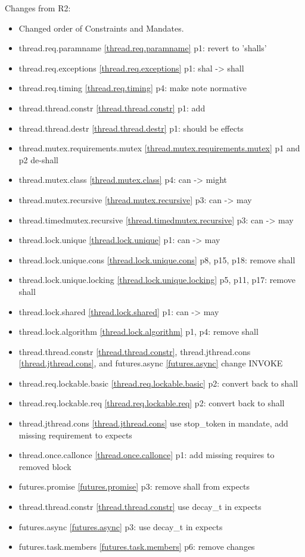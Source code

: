 Changes from R2:
\begin{itemize}
\item{Changed order of Constraints and Mandates.}
\item{ thread.req.paramname \ref{thread.req.paramname} p1: revert to 'shalls'}
\item{ thread.req.exceptions \ref{thread.req.exceptions} p1:  shal -> shall}
\item{ thread.req.timing \ref{thread.req.timing} p4: make note normative}
\item{ thread.thread.constr \ref{thread.thread.constr} p1: add }
\item{ thread.thread.destr \ref{thread.thread.destr}  p1: should be effects}
\item{ thread.mutex.requirements.mutex \ref{thread.mutex.requirements.mutex} p1 and p2 de-shall}
\item{ thread.mutex.class \ref{thread.mutex.class} p4: can -> might}
\item{ thread.mutex.recursive \ref{thread.mutex.recursive} p3: can -> may}
\item{ thread.timedmutex.recursive \ref{thread.timedmutex.recursive} p3: can -> may}
\item{ thread.lock.unique \ref{thread.lock.unique} p1: can -> may}
\item{ thread.lock.unique.cons \ref{thread.lock.unique.cons} p8, p15, p18: remove shall}
\item{ thread.lock.unique.locking \ref{thread.lock.unique.locking} p5, p11, p17: remove shall}
\item{ thread.lock.shared \ref{thread.lock.shared} p1: can -> may}
\item{ thread.lock.algorithm \ref{thread.lock.algorithm} p1, p4: remove shall}
\item{ thread.thread.constr \ref{thread.thread.constr}, thread.jthread.cons \ref{thread.jthread.cons}, and futures.async \ref{futures.async} change INVOKE}
\item{ thread.req.lockable.basic \ref{thread.req.lockable.basic} p2: convert back to shall}
\item{ thread.req.lockable.req \ref{thread.req.lockable.req} p2: convert back to shall}
\item{ thread.jthread.cons \ref{thread.jthread.cons} use stop_token in mandate, add missing requirement to expects}
\item{ thread.once.callonce \ref{thread.once.callonce} p1: add missing requires to removed block}
\item{ futures.promise \ref{futures.promise} p3: remove shall from expects}
\item{ thread.thread.constr \ref{thread.thread.constr} use decay_t in expects}
\item{ futures.async \ref{futures.async} p3: use decay_t in expects}
\item{ futures.task.members \ref{futures.task.members} p6: remove changes}
\end{itemize}

